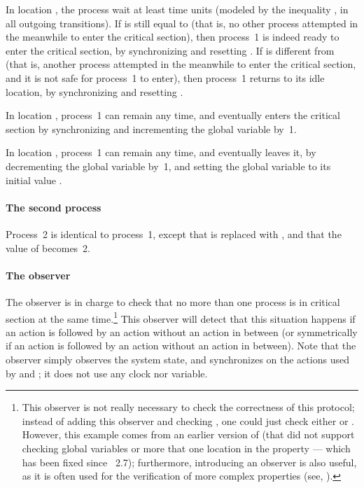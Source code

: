 In location , the process wait at least  time units (modeled by the inequality , in all outgoing transitions).
If  is still equal to  (that is, no other process attempted in the meanwhile to enter the critical section), then process~1 is indeed ready to enter the critical section, by synchronizing  and resetting .
If  is different from  (that is, another process attempted in the meanwhile to enter the critical section, and it is not safe for process~1 to enter), then process~1 returns to its idle location, by synchronizing  and resetting .

In location , process~1 can remain any time, and eventually enters the critical section by synchronizing  and incrementing the global variable  by~1.

In location , process~1 can remain any time, and eventually leaves it, by decrementing the global variable  by~1, and setting the global variable  to its initial value .

\paragraph{The second process}
Process~2 is identical to process~1, except that  is replaced with , and that the value of  becomes~2.


\paragraph{The observer}
The observer is in charge to check that no more than one process is in critical section at the same time.\footnote{%
	This observer is not really necessary to check the correctness of this protocol;
	instead of adding this observer and checking , one could just check either  or .
	However, this example comes from an earlier version of \imitator{} (that did not support checking global variables or more that one location in the  property --- which has been fixed since \imitator{}~2.7); furthermore, introducing an observer is also useful, as it is often used for the verification of more complex properties (see, \eg{} \cite{ABL98,ABBL98}).
}
This observer will detect that this situation happens if an action  is followed by an action  without an action  in between (or symmetrically if an action  is followed by an action  without an action  in between).
Note that the observer simply observes the system state, and synchronizes on the actions used by  and ; it does not use any clock nor variable.

